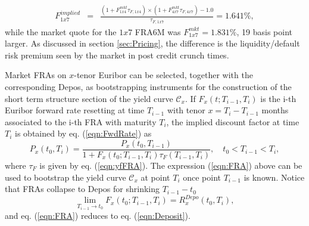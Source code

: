 \documentclass[11pt,reqno]{amsart}
\begin{document}
\begin{eqnarray}
F_{1x7}^{implied}
&=& \frac{
    \left(1 + F_{1x4}^{mkt}\tau_{F,1x4}\right) \times
    \left(1 + F_{4x7}^{mkt}\tau_{F,4x7}\right) - 1.0}
    {\tau_{F,1x7}} = 1.641\%,
\label{eqn:FRAarbitrage}
\end{eqnarray}
while the market quote for the $1x7$ FRA6M was $F_{1x7}^{mkt}=1.831\%$, 19 basis point larger. As discussed in section \ref{sec:Pricing}, the difference is the liquidity/default risk premium seen by the market in post credit crunch times.
\par
Market FRAs on $x$-tenor Euribor can be selected, together with the corresponding Depos, as bootstrapping instruments for the construction of the short term structure section of the yield curve $\mathcal{C}_x$.
If $F_x\left(t;T_{i-1},T_i\right)$ is the i-th Euribor forward rate resetting at time $T_{i-1}$ with tenor $x=T_i-T_{i-1}$ months associated to the i-th FRA with maturity $T_i$, the implied discount factor at time $T_i$ is obtained by eq. (\ref{eqn:FwdRate}) as
\begin{equation}
P_x\left(t_0,T_i\right) = \frac{P_x\left(t_0,T_{i-1}\right)}{1+F_{x}\left(t_0;T_{i-1},T_{i}\right)\tau_F\left(T_{i-1},T_{i}\right) },\quad t_0<T_{i-1}<T_i,
\label{eqn:FRA}
\end{equation}
where $\tau_F$ is given by eq. (\ref{eqn:yfFRA}). The expression (\ref{eqn:FRA}) above can be used to bootstrap the yield curve $\mathcal{C}_x$ at point $T_i$ once point $T_{i-1}$ is known.
Notice that FRAs collapse to Depos for shrinking $T_{i-1}-t_0$
\begin{equation}
\lim_{T_{i-1} \to t_0}F_{x}\left(t_0;T_{i-1},T_{i}\right) = R^{Depo}_x\left(t_0,T_i\right),
\end{equation}
and eq. (\ref{eqn:FRA}) reduces to eq. (\ref{eqn:Deposit}).
\par
\end{document}
